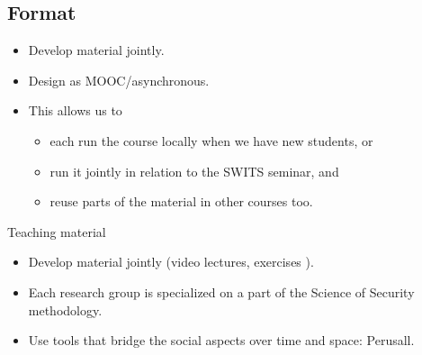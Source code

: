\subsection{Format}

\begin{frame}
  \begin{idea}
    \begin{itemize}
      \item Develop material jointly.
      \item Design as MOOC/asynchronous.
      \item This allows us to
        \begin{itemize}
          \item each run the course locally when we have new students, or
          \item run it jointly in relation to the SWITS seminar, and
          \item reuse parts of the material in other courses too.
        \end{itemize}
    \end{itemize}
  \end{idea}
\end{frame}

\begin{frame}
  \begin{block}{Teaching material}
    \begin{itemize}
      \item Develop material jointly (video lectures, exercises \etc).
      \item Each research group is specialized on a part of the Science of 
        Security methodology.

      \item Use tools that bridge the social aspects over time and space:
        \eg Perusall.
    \end{itemize}
  \end{block}
\end{frame}

